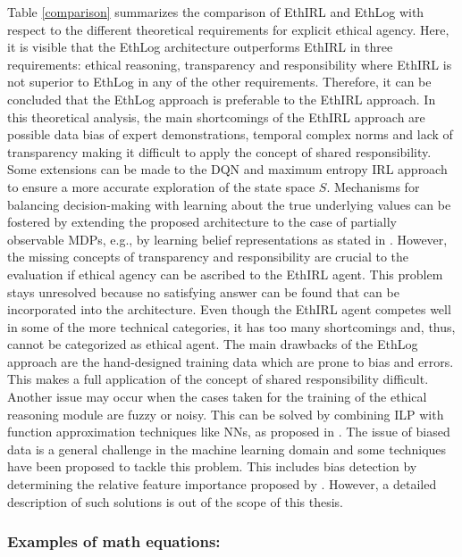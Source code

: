 Table \ref{comparison} summarizes the comparison of EthIRL and EthLog with respect to the different theoretical requirements for explicit ethical agency. Here, it is visible that the EthLog architecture outperforms EthIRL in three requirements: ethical reasoning, transparency and responsibility where EthIRL is not superior to EthLog in any of the other requirements. Therefore, it can be concluded that the EthLog approach is preferable to the EthIRL approach. In this theoretical analysis, the main shortcomings of the EthIRL approach are possible data bias of expert demonstrations, temporal complex norms and lack of transparency making it difficult to apply the concept of shared responsibility. Some extensions can be made to the DQN and maximum entropy IRL approach to ensure a more accurate exploration of the state space $S$. Mechanisms for balancing decision-making with learning about the true underlying values can be fostered by extending the proposed architecture to the case of partially observable MDPs, e.g., by learning belief representations as stated in \cite{gangwani2019learning}. However, the missing concepts of transparency and responsibility are crucial to the evaluation if ethical agency can be ascribed to the EthIRL agent. This problem stays unresolved because no satisfying answer can be found that can be incorporated into the architecture. Even though the EthIRL agent competes well in some of the more technical categories, it has too many shortcomings and, thus, cannot be categorized as ethical agent. The main drawbacks of the EthLog approach are the hand-designed training data which are prone to bias and errors. This makes a full application of the concept of shared responsibility difficult. Another issue may occur when the cases taken for the training of the ethical reasoning module are fuzzy or noisy. This can be solved by combining ILP with function approximation techniques like NNs, as proposed in \cite{evans2018learning, payani2019inductive}. The issue of biased data is a general challenge in the machine learning domain and some techniques have been proposed to tackle this problem. This includes bias detection by determining the relative feature importance proposed by \cite{adebayo2016fairml}. However, a detailed description of such solutions is out of the scope of this thesis. \\


\subsubsection{Examples of math equations:}

